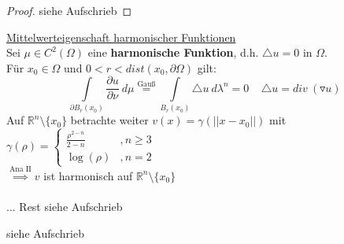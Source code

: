 \begin{proof}
  siehe Aufschrieb
\end{proof}

\begin{example}
  \underline{Mittelwerteigenschaft harmonischer Funktionen}\\
  Sei $\mu \in C^2(\Omega)$ eine \textbf{harmonische Funktion}, d.h. $\triangle u = 0$ in $\Omega$.\\
  Für $x_0 \in \Omega$ und $0<r<dist(x_0, \partial \Omega)$ gilt:
  $$\int\limits_{\partial B_r(x_0)} \frac{\partial u}{\partial \nu} \ d\mu \stackrel{\text{Gauß}}{=} \int\limits_{B_r(x_0)} \triangle u \ d\lambda^n = 0 \ \ \ \ \ \triangle u = div \ (\triangledown u)$$
  Auf $\mathbb{R}^n\setminus\{x_0\}$ betrachte weiter $v(x) = \gamma(||x-x_0||)$ mit $\gamma(\rho) = \begin{cases}
    \frac{\rho^{2-n}}{2-n} & , n\geq 3\\
    \log(\rho) & , n = 2
  \end{cases}$\\
  $\stackrel{\text{Ana II}}{\implies} v$ ist harmonisch auf $\mathbb{R}^n\setminus\{x_0\}$\\
  \\
  ... Rest siehe Aufschrieb
\end{example}

\begin{example}
  siehe Aufschrieb
\end{example}